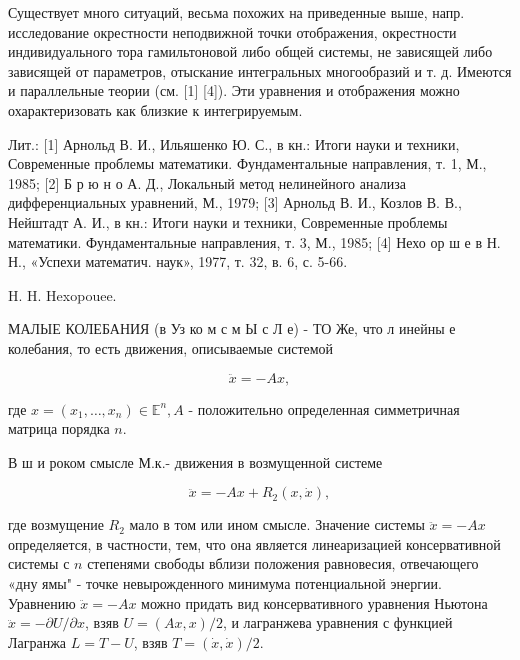 \documentclass[10pt]{article}
\begin{document}
Существует много ситуаций, весьма похожих на приведенные выше, напр. исследование окрестности неподвижной точки отображения, окрестности индивидуального тора гамильтоновой либо общей системы, не зависящей либо зависящей от параметров, отыскание интегральных многообразий и т. д. Имеются и параллельные теории (см. [1] [4]). Эти уравнения и отображения можно охарактеризовать как близкие к интегрируемым.



Лит.: [1] Арнольд В. И., Ильяшенко Ю. С., в кн.: Итоги науки и техники, Современные проблемы математики. Фундаментальные направления, т. 1, М., 1985; [2] Б р ю н о А. Д., Локальный метод нелинейного анализа дифференциальных уравнений, М., 1979; [3] Арнольд В. И., Козлов В. В., Нейштадт А. И., в кн.: Итоги науки и техники, Современные проблемы математики. Фундаментальные направления, т. 3, М., 1985; [4] Нехо ор ш е в Н. Н., «Успехи математич. наук», 1977, т. 32, в. 6, с. 5-66.



H. H. Hexopouee.



МАЛЫЕ КОЛЕБАНИЯ (в Уз ко м с м Ы с Л е) - ТО Же, что л инейны е колебания, то есть движения, описываемые системой



\[

\ddot{x}=-A x,

\]



где $x=\left(x_{1}, \ldots, x_{n}\right) \in \mathbb{E}^{n}, A$ - положительно определенная симметричная матрица порядка $n$.



В ш и роком смысле М.к.- движения в возмущенной системе



\[

\ddot{x}=-A x+R_{2}(x, \dot{x}),

\]



где возмущение $R_{2}$ мало в том или ином смысле. Значение системы $\ddot{x}=-A x$ определяется, в частности, тем, что она является линеаризацией консервативной системы с $n$ степенями свободы вблизи положения равновесия, отвечающего «дну ямы" - точке невырожденного минимума потенциальной энергии. Уравнению $\ddot{x}=-A x$ можно придать вид консервативного уравнения Ньютона $\ddot{x}=-\partial U / \partial x$, взяв $U=(A x, x) / 2$, и лагранжева уравнения с функцией Лагранжа $L=T-U$, взяв $T=(\dot{x}, \dot{x}) / 2$.
\end{document}
